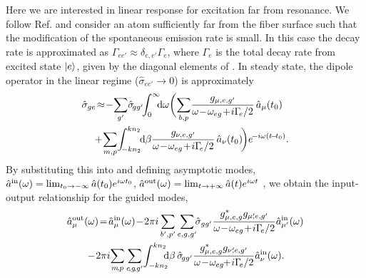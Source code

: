 \documentclass[aps,pra,twocolumn]{revtex4-1} %
\newcommand{\inp}{{\rm in}}
\newcommand{\out}{{\rm out}}
\begin{document}
Here we are interested in linear response for excitation far from resonance. We follow Ref. \cite{le_kien_propagation_2014} and consider an atom sufficiently far from the fiber surface such that the modification of the spontaneous emission rate is small.   In this case the decay rate is approximated as $\Gamma_{ee'} \approx \delta_{e,e'} \Gamma_{e}$, where $\Gamma_e$ is the total decay rate from excited state $\lvert{e}\rangle$, given by the diagonal elements of .  In steady state, the dipole operator in the linear regime ($\hat{\sigma}_{ee'} \rightarrow 0 $) is approximately
	\begin{align}
		\hat{\sigma}_{ge} &\!\approx\!  -\!\sum_{g'}\! \hat{\sigma}\!_{gg'}\!\!\int_0^{\infty}\!\!\!\mathrm{d}\omega \bigg(\!  \sum_{b,p}\!  
\frac{g_{\mu, e,g'}}{\omega\!-\!\omega_{eg} \!+\! i \Gamma\!_{e}/2  }\, \hat{a}_\mu (t_0) \nn\\
	&\!\! +\!\sum_{m,p}\! \int_{\!-kn_2}^{kn_2}\!\!\mathrm{d}\beta  \frac{g_{\nu, e,g'}}{\omega\!-\!\omega_{eg} \!+\! i \Gamma\!_{e}/2 } \,\hat{a}_\nu (t_0)  \!\bigg)e^{\!-i\omega (t\!-\!t_0)} . 
	\end{align}
By substituting this into  and defining asymptotic modes, $\hat{a}^{\inp}(\omega) = \lim_{t_0\rightarrow -\infty} \hat{a}(t_0) e^{i\omega t_0}$, $\hat{a}^{\out}(\omega) = \lim_{t\rightarrow +\infty} \hat{a}(t) e^{i\omega t}$ \cite{fan_input-output_2010}, we obtain the input-output relationship for the guided modes, 
	\begin{align} \label{Eq::aout}
		\hat{a}^{\out}_\mu (\omega) &\!=\! \hat{a}^{\inp}_\mu (\omega) \!-\! 2\pi i\sum_{b',p'} 
\sum_{e,g,g'}\!\!\hat{\sigma}_{gg'}\frac{ g_{\mu,e,g}^* g_{\mu'\!\!,e,g'}}{ \omega \!-\! \omega_{eg} \!+\! i \Gamma\!_{e}/2 }\hat{a}^{\inp}_{\mu'}(\omega) \nn\\
&\!\!\!\!\!\!\!\!-\! 2\pi i\!\sum_{m\!,p} \sum_{e\!,g\!,g'}\! \int^{kn_2}_{-kn_2}\!\!\!\! \mathrm{d}\beta \,\hat{\sigma}\!_{gg'}\frac{ g_{\mu,e,g}^* g_{\nu'\!\!,e,g'}}{ \omega \!-\! \omega_{eg} \!\!+\! i \Gamma\!_{e}/2 }\hat{a}^{\inp}_{\nu}(\omega).
	\end{align}
	
\end{document}
